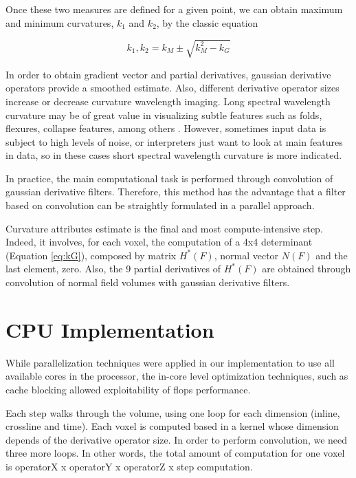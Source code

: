 \documentclass[conference]{IEEEtran}
\begin{document}
Once these two measures are defined for a given point, we can obtain maximum and minimum curvatures,  $k_1$ and $k_2$, by the classic equation

\begin{equation}
k_1,k_2 = k_M \pm \sqrt{k^2_M - k_G}
\end{equation}


In order to obtain gradient vector and partial derivatives, gaussian derivative operators provide a smoothed estimate. Also, different derivative operator sizes increase or decrease curvature wavelength imaging. Long spectral wavelength curvature may be of great value in visualizing subtle features such as folds, flexures, collapse features, among others \cite{dossary}. However, sometimes input data is subject to high levels of noise, or interpreters just want to look at main features in data, so in these cases short spectral wavelength curvature is more indicated.

In practice, the main computational task is performed through convolution of gaussian derivative filters. Therefore, this method has the advantage that a filter based on convolution can be straightly formulated in a parallel approach.

Curvature attributes estimate is the final and most compute-intensive step. Indeed, it involves, for each voxel, the computation of a 4x4 determinant (Equation \ref{eq:kG}), composed by matrix $H^*(F)$, normal vector $N(F)$ and the last element, zero. Also, the 9 partial derivatives of  $H^*(F)$ are obtained through convolution of normal field volumes with gaussian derivative filters.

\section{CPU Implementation} \label{sec:cpu}

While parallelization techniques were applied in our implementation to use all available cores in the processor, the in-core level optimization techniques, such as cache blocking allowed exploitability of flops performance.

Each step walks through the volume, using one loop for each dimension (inline, crossline and time). Each voxel is computed based in a kernel whose dimension depends of the derivative operator size. In order to perform convolution, we need three more loops. In other words, the total amount of computation for one voxel is operatorX x operatorY x operatorZ x step computation.
\end{document}
